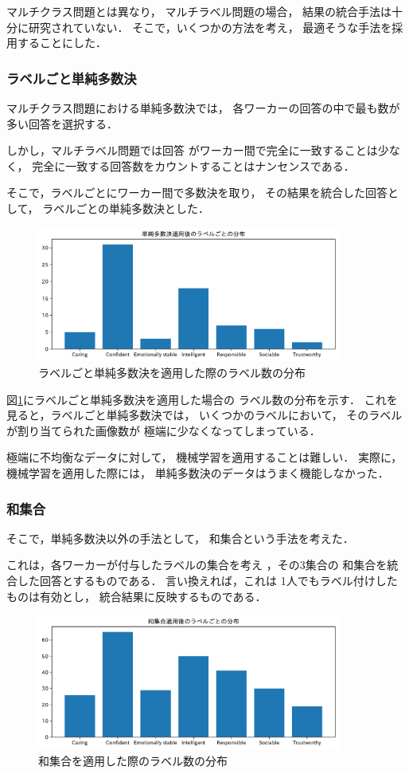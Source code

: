 マルチクラス問題とは異なり，
マルチラベル問題の場合，
結果の統合手法は十分に研究されていない．
そこで，いくつかの方法を考え，
最適そうな手法を採用することにした．

\subsubsection{ラベルごと単純多数決}
マルチクラス問題における単純多数決では，
各ワーカーの回答の中で最も数が多い回答を選択する．

しかし，マルチラベル問題では回答
がワーカー間で完全に一致することは少なく，
完全に一致する回答数をカウントすることはナンセンスである．

そこで，ラベルごとにワーカー間で多数決を取り，
その結果を統合した回答として，
ラベルごとの単純多数決とした．

\begin{figure}[tb]
  \centering
  \includegraphics[width=10cm]{ch2/smv_plot.pdf}
  \caption{ラベルごと単純多数決を適用した際のラベル数の分布
  \label{fig:ch2:smv}}
\end{figure}

図\ref{fig:ch2:smv}にラベルごと単純多数決を適用した場合の
ラベル数の分布を示す．
これを見ると，ラベルごと単純多数決では，
いくつかのラベルにおいて，
そのラベルが割り当てられた画像数が
極端に少なくなってしまっている．

極端に不均衡なデータに対して，
機械学習を適用することは難しい．
実際に，機械学習を適用した際には，
単純多数決のデータはうまく機能しなかった．

\subsubsection{和集合}
そこで，単純多数決以外の手法として，
和集合という手法を考えた．

これは，各ワーカーが付与したラベルの集合を考え
，その3集合の
和集合を統合した回答とするものである．
言い換えれば，これは
1人でもラベル付けしたものは有効とし，
統合結果に反映するものである．

\begin{figure}[tb]
  \centering
  \includegraphics[width=10cm]{ch2/svs_plot.pdf}
  \caption{和集合を適用した際のラベル数の分布
  \label{fig:ch2:svs}}
\end{figure}

